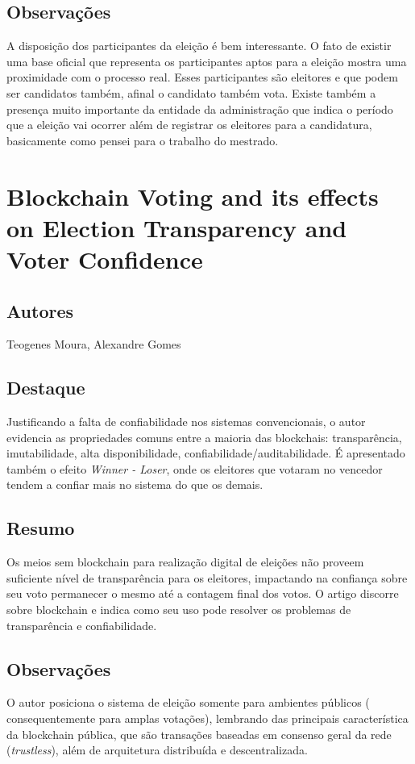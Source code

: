\documentclass[letterpaper, 12 pt, conference]{ieeeconf}
\begin{document}
    \subsection{Observações}
        A disposição dos participantes da eleição é bem interessante. O fato de existir uma base oficial que representa os participantes aptos para a eleição mostra uma proximidade com o processo real. Esses participantes são eleitores e que podem ser candidatos também, afinal o candidato também vota. Existe também a presença muito importante da entidade da administração que indica o período que a eleição vai ocorrer além de registrar os eleitores para a candidatura, basicamente como pensei para o trabalho do mestrado.
        
\section{Blockchain Voting and its effects on Election Transparency and Voter Confidence}
    \subsection{Autores}
        Teogenes Moura, Alexandre Gomes
    \subsection{Destaque}
        Justificando a falta de confiabilidade nos sistemas convencionais, o autor evidencia as propriedades comuns entre a maioria das blockchais: transparência, imutabilidade, alta disponibilidade, confiabilidade/auditabilidade. É apresentado também o efeito \textit{Winner - Loser}, onde os eleitores que votaram no vencedor tendem a confiar mais no sistema do que os demais. 
        
    \subsection{Resumo}
        Os meios sem blockchain para realização digital de eleições não proveem suficiente nível de transparência para os eleitores, impactando na confiança sobre seu voto permanecer o mesmo até a contagem final dos votos. O artigo discorre sobre blockchain e indica como seu uso pode resolver os problemas de transparência e confiabilidade.
        
    \subsection{Observações}
        O autor posiciona o sistema de eleição somente para ambientes públicos ( consequentemente para amplas votações), lembrando das principais característica da blockchain pública, que são transações baseadas em consenso geral da rede (\textit{trustless}), além de arquitetura distribuída e descentralizada. 
        
\end{document}
